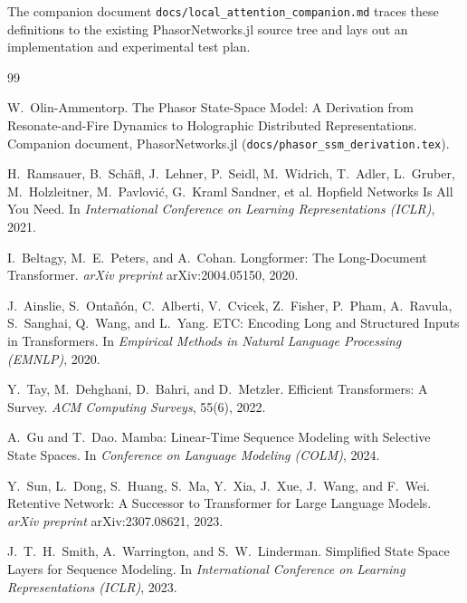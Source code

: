 \documentclass[11pt]{article}
\theoremstyle{definition}
\begin{document}
The companion document
\texttt{docs/local\_attention\_companion.md} traces these definitions
to the existing PhasorNetworks.jl source tree and lays out an
implementation and experimental test plan.

\begin{thebibliography}{99}

W.\ Olin-Ammentorp.
\newblock The Phasor State-Space Model: A Derivation from
  Resonate-and-Fire Dynamics to Holographic Distributed Representations.
\newblock Companion document, PhasorNetworks.jl
  (\texttt{docs/phasor\_ssm\_derivation.tex}).

H.\ Ramsauer, B.\ Sch{\"a}fl, J.\ Lehner, P.\ Seidl, M.\ Widrich,
T.\ Adler, L.\ Gruber, M.\ Holzleitner, M.\ Pavlovi{\'c},
G.\ Kraml Sandner, et al.
\newblock Hopfield Networks Is All You Need.
\newblock In \emph{International Conference on Learning Representations
  (ICLR)}, 2021.

I.\ Beltagy, M.\ E.\ Peters, and A.\ Cohan.
\newblock Longformer: The Long-Document Transformer.
\newblock \emph{arXiv preprint} arXiv:2004.05150, 2020.

J.\ Ainslie, S.\ Onta{\~n}{\'o}n, C.\ Alberti, V.\ Cvicek, Z.\ Fisher,
P.\ Pham, A.\ Ravula, S.\ Sanghai, Q.\ Wang, and L.\ Yang.
\newblock ETC: Encoding Long and Structured Inputs in Transformers.
\newblock In \emph{Empirical Methods in Natural Language Processing
  (EMNLP)}, 2020.

Y.\ Tay, M.\ Dehghani, D.\ Bahri, and D.\ Metzler.
\newblock Efficient Transformers: A Survey.
\newblock \emph{ACM Computing Surveys}, 55(6), 2022.

A.\ Gu and T.\ Dao.
\newblock Mamba: Linear-Time Sequence Modeling with Selective State
  Spaces.
\newblock In \emph{Conference on Language Modeling (COLM)}, 2024.

Y.\ Sun, L.\ Dong, S.\ Huang, S.\ Ma, Y.\ Xia, J.\ Xue, J.\ Wang, and
F.\ Wei.
\newblock Retentive Network: A Successor to Transformer for Large
  Language Models.
\newblock \emph{arXiv preprint} arXiv:2307.08621, 2023.

J.\ T.\ H.\ Smith, A.\ Warrington, and S.\ W.\ Linderman.
\newblock Simplified State Space Layers for Sequence Modeling.
\newblock In \emph{International Conference on Learning Representations
  (ICLR)}, 2023.


\end{thebibliography}
\end{document}
